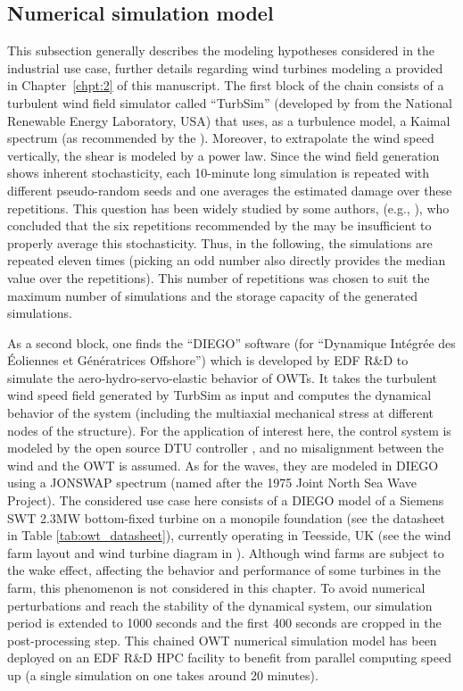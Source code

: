 \subsection{Numerical simulation model}
This subsection generally describes the modeling hypotheses considered in the industrial use case, further details regarding wind turbines modeling a provided in Chapter~\ref{chpt:2} of this manuscript. 
The first block of the chain consists of a turbulent wind field simulator called ``TurbSim'' (developed by \citealp{turbsim_2009} from the National Renewable Energy Laboratory, USA) that uses, as a turbulence model, a Kaimal spectrum \citep{kaimal_1972} (as recommended by the \citealp{iec_2019}). 
Moreover, to extrapolate the wind speed vertically, the shear is modeled by a power law. 
Since the wind field generation shows inherent stochasticity, each 10-minute long simulation is repeated with different pseudo-random seeds and one averages the estimated damage over these repetitions. 
This question has been widely studied by some authors, (e.g., \citealp{slot_sorensen_2020}), who concluded that the six repetitions recommended by the \citet{iec_2019} may be insufficient to properly average this stochasticity. 
Thus, in the following, the simulations are repeated eleven times (picking an odd number also directly provides the median value over the repetitions). 
This number of repetitions was chosen to suit the maximum number of simulations and the storage capacity of the generated simulations.

As a second block, one finds the ``DIEGO'' software (for ``Dynamique Intégrée des Éoliennes et Génératrices Offshore''\footnotemark) which is developed by EDF R\&D \citep{kim_natarajan_2022} to simulate the aero-hydro-servo-elastic behavior of OWTs. 
It takes the turbulent wind speed field generated by TurbSim as input and computes the dynamical behavior of the system (including the multiaxial mechanical stress at different nodes of the structure). 
For the application of interest here, the control system is modeled by the open source DTU controller \citep{dtu_controler_2013}, and no misalignment between the wind and the OWT is assumed. 
As for the waves, they are modeled in DIEGO using a JONSWAP spectrum (named after the 1975 Joint North Sea Wave Project). 
The considered use case here consists of a DIEGO model of a Siemens SWT 2.3MW bottom-fixed turbine on a monopile foundation (see the datasheet in Table \ref{tab:owt_datasheet}), currently operating in Teesside, UK (see the wind farm layout and wind turbine diagram in ). 
Although wind farms are subject to the wake effect, affecting the behavior and performance of some turbines in the farm, this phenomenon is not considered in this chapter. 
To avoid numerical perturbations and reach the stability of the dynamical system, our simulation period is extended to 1000 seconds and the first 400 seconds are cropped in the post-processing step. 
This chained OWT numerical simulation model has been deployed on an EDF R\&D HPC facility to benefit from parallel computing speed up (a single simulation on one  takes around 20 minutes).

